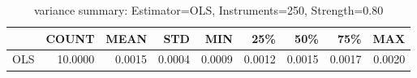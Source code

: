 \begin{table}[ht]
\centering
\caption{variance summary: Estimator=OLS, Instruments=250, Strength=0.80}
\begin{tabular}{lrrrrrrrr}
\toprule
 & COUNT & MEAN & STD & MIN & 25\% & 50\% & 75\% & MAX \\
\midrule
OLS & 10.0000 & 0.0015 & 0.0004 & 0.0009 & 0.0012 & 0.0015 & 0.0017 & 0.0020 \\
\bottomrule
\end{tabular}
\end{table}
